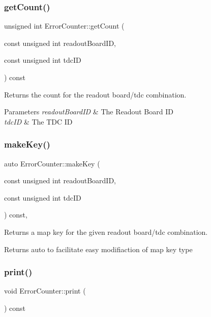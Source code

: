 \subsubsection{\texorpdfstring{get\+Count()}{getCount()}}
{\footnotesize\ttfamily unsigned int Error\+Counter\+::get\+Count (\begin{DoxyParamCaption}\item[{const unsigned int}]{readout\+Board\+ID,  }\item[{const unsigned int}]{tdc\+ID }\end{DoxyParamCaption}) const\hspace{0.3cm}{\ttfamily [inline]}}



Returns the count for the readout board/tdc combination. 


\begin{DoxyParams}{Parameters}
{\em readout\+Board\+ID} & The Readout Board ID \\
\hline
{\em tdc\+ID} & The T\+DC ID \\
\hline
\end{DoxyParams}
\mbox{\label{class_error_counter_aa54fb5fe5884956ba9d8ca8b44f74fcb}} 
\subsubsection{\texorpdfstring{make\+Key()}{makeKey()}}
{\footnotesize\ttfamily auto Error\+Counter\+::make\+Key (\begin{DoxyParamCaption}\item[{const unsigned int}]{readout\+Board\+ID,  }\item[{const unsigned int}]{tdc\+ID }\end{DoxyParamCaption}) const\hspace{0.3cm}{\ttfamily [inline]}, {\ttfamily [private]}}



Returns a map key for the given readout board/tdc combination. 

Returns auto to facilitate easy modifiaction of map key type \mbox{\label{class_error_counter_a12b0eba237f5de0c56d5365bb84fa025}} 
\subsubsection{\texorpdfstring{print()}{print()}}
{\footnotesize\ttfamily void Error\+Counter\+::print (\begin{DoxyParamCaption}{ }\end{DoxyParamCaption}) const}



